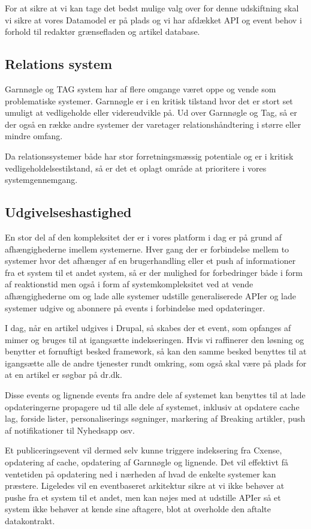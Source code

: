 \documentclass{article}
\begin{document}
For at sikre at vi kan tage det bedst mulige valg over for denne udskiftning skal vi sikre at vores Datamodel er på plads og vi har afdækket API og event behov i forhold til redaktør grænsefladen og artikel database. 

\subsection{Relations system}
Garnnøgle og TAG system har af flere omgange været oppe og vende som problematiske systemer. Garnnøgle er i en kritisk tilstand hvor det er stort set umuligt at vedligeholde eller videreudvikle på. Ud over Garnnøgle og Tag, så er der også en række andre systemer der varetager relationshåndtering i større eller mindre omfang.

Da relationssystemer både har stor forretningsmæssig potentiale og er i kritisk vedligeholdelsestilstand, så er det et oplagt område at prioritere i vores systemgennemgang.

\subsection{Udgivelseshastighed}

En stor del af den kompleksitet der er i vores platform i dag er på grund af afhængighederne imellem systemerne. Hver gang der er forbindelse mellem to systemer hvor det afhænger af en brugerhandling eller et push af informationer fra et system til et andet system, så er der mulighed for forbedringer både i form af reaktionstid men også i form af systemkompleksitet ved at vende afhængighederne om og lade alle systemer udstille generaliserede APIer og lade systemer udgive og abonnere på events i forbindelse med opdateringer.

I dag, når en artikel udgives i Drupal, så skabes der et event, som opfanges af mimer og bruges til at igangsætte indekseringen.
Hvis vi raffinerer den løsning og benytter et fornuftigt besked framework, så kan den samme besked benyttes til at igangsætte alle de andre tjenester rundt omkring, som også skal være på plads for at en artikel er søgbar på dr.dk.

Disse events og lignende events fra andre dele af systemet kan benyttes til at lade opdateringerne propagere ud til alle dele af systemet, inklusiv at opdatere cache lag, forside lister, personaliserings søgninger, markering af Breaking artikler, push af notifikationer til Nyhedsapp  osv. 

Et publiceringsevent vil dermed selv kunne triggere indeksering fra Cxense, opdatering af cache, opdatering af Garnnøgle og lignende. Det vil effektivt få ventetiden på opdatering ned i nærheden af hvad de enkelte systemer kan præstere.
Ligeledes vil en eventbaseret arkitektur sikre at vi ikke behøver at pushe fra et system til et andet, men kan nøjes med at udstille APIer så et system ikke behøver at kende sine aftagere, blot at overholde den aftalte datakontrakt.
\end{document}
